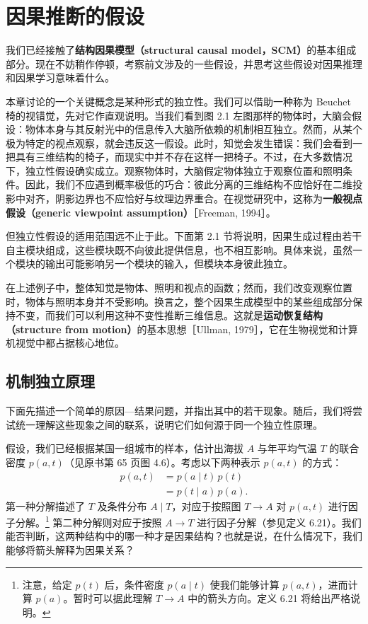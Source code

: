 \chapter{因果推断的假设}
\label{ch:assumptions-causal-inference}

我们已经接触了\textbf{结构因果模型（structural causal model，SCM）}的基本组成部分。现在不妨稍作停顿，考察前文涉及的一些假设，并思考这些假设对因果推理和因果学习意味着什么。

本章讨论的一个关键概念是某种形式的独立性。我们可以借助一种称为 Beuchet 椅的视错觉，先对它作直观说明。当我们看到图 2.1 左图那样的物体时，大脑会假设：物体本身与其反射光中的信息传入大脑所依赖的机制相互独立。然而，从某个极为特定的视点观察，就会违反这一假设。此时，知觉会发生错误：我们会看到一把具有三维结构的椅子，而现实中并不存在这样一把椅子。不过，在大多数情况下，独立性假设确实成立。观察物体时，大脑假定物体独立于观察位置和照明条件。因此，我们不应遇到概率极低的巧合：彼此分离的三维结构不应恰好在二维投影中对齐，阴影边界也不应恰好与纹理边界重合。在视觉研究中，这称为\textbf{一般视点假设（generic viewpoint assumption）}［Freeman, 1994］。

但独立性假设的适用范围远不止于此。下面第 2.1 节将说明，因果生成过程由若干自主模块组成，这些模块既不向彼此提供信息，也不相互影响。具体来说，虽然一个模块的输出可能影响另一个模块的输入，但模块本身彼此独立。

在上述例子中，整体知觉是物体、照明和视点的函数；然而，我们改变观察位置时，物体与照明本身并不受影响。换言之，整个因果生成模型中的某些组成部分保持不变，而我们可以利用这种不变性推断三维信息。这就是\textbf{运动恢复结构（structure from motion）}的基本思想［Ullman, 1979］，它在生物视觉和计算机视觉中都占据核心地位。


\FloatBarrier
\section{机制独立原理}
\label{sec:independent-mechanisms}

下面先描述一个简单的原因—结果问题，并指出其中的若干现象。随后，我们将尝试统一理解这些现象之间的联系，说明它们如何源于同一个独立性原理。

假设，我们已经根据某国一组城市的样本，估计出海拔 $A$ 与年平均气温 $T$ 的联合密度 $p(a,t)$（见原书第 65 页图 4.6）。考虑以下两种表示 $p(a,t)$ 的方式：
\begin{equation}
\begin{aligned}
 p(a,t)&=p(a\mid t)\,p(t)\\
       &=p(t\mid a)\,p(a).
\end{aligned}
\tag{2.1}
\end{equation}
第一种分解描述了 $T$ 及条件分布 $A\mid T$，对应于按照图 $T\to A$ 对 $p(a,t)$ 进行因子分解。\footnote{注意，给定 $p(t)$ 后，条件密度 $p(a\mid t)$ 使我们能够计算 $p(a,t)$，进而计算 $p(a)$。暂时可以据此理解 $T\to A$ 中的箭头方向。定义 6.21 将给出严格说明。}
第二种分解则对应于按照 $A\to T$ 进行因子分解（参见定义 6.21）。我们能否判断，这两种结构中的哪一种才是因果结构？也就是说，在什么情况下，我们能够将箭头解释为因果关系？

